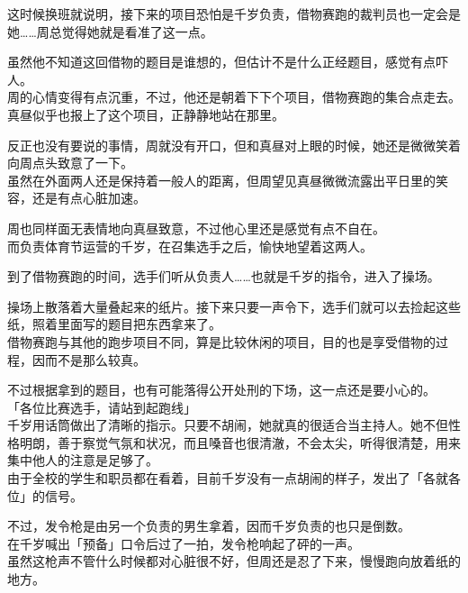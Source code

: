 这时候换班就说明，接下来的项目恐怕是千岁负责，借物赛跑的裁判员也一定会是她……周总觉得她就是看准了这一点。

虽然他不知道这回借物的题目是谁想的，但估计不是什么正经题目，感觉有点吓人。\\

周的心情变得有点沉重，不过，他还是朝着下下个项目，借物赛跑的集合点走去。真昼似乎也报上了这个项目，正静静地站在那里。

反正也没有要说的事情，周就没有开口，但和真昼对上眼的时候，她还是微微笑着向周点头致意了一下。\\

虽然在外面两人还是保持着一般人的距离，但周望见真昼微微流露出平日里的笑容，还是有点心脏加速。

周也同样面无表情地向真昼致意，不过他心里还是感觉有点不自在。\\

而负责体育节运营的千岁，在召集选手之后，愉快地望着这两人。\\

\vspace{2\baselineskip}

到了借物赛跑的时间，选手们听从负责人……也就是千岁的指令，进入了操场。

操场上散落着大量叠起来的纸片。接下来只要一声令下，选手们就可以去捡起这些纸，照着里面写的题目把东西拿来了。\\

借物赛跑与其他的跑步项目不同，算是比较休闲的项目，目的也是享受借物的过程，因而不是那么较真。

不过根据拿到的题目，也有可能落得公开处刑的下场，这一点还是要小心的。\\

「各位比赛选手，请站到起跑线」\\

千岁用话筒做出了清晰的指示。只要不胡闹，她就真的很适合当主持人。她不但性格明朗，善于察觉气氛和状况，而且嗓音也很清澈，不会太尖，听得很清楚，用来集中他人的注意是足够了。\\

由于全校的学生和职员都在看着，目前千岁没有一点胡闹的样子，发出了「各就各位」的信号。

不过，发令枪是由另一个负责的男生拿着，因而千岁负责的也只是倒数。\\

在千岁喊出「预备」口令后过了一拍，发令枪响起了砰的一声。\\

虽然这枪声不管什么时候都对心脏很不好，但周还是忍了下来，慢慢跑向放着纸的地方。

